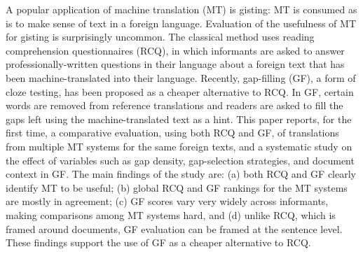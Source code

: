 A popular application of machine translation (MT) is gisting: MT is consumed as is to make sense of text in  a foreign language. Evaluation of the usefulness of MT for gisting is surprisingly uncommon. The classical method uses reading comprehension questionnaires (RCQ), in which informants are asked to answer professionally-written questions in their language about a foreign text that has been machine-translated into their language. Recently, gap-filling (GF), a form of cloze testing, has been proposed as a cheaper alternative to RCQ. In GF,  certain words are removed from reference translations and readers are asked to fill the gaps left using the machine-translated text as a hint. This paper reports, for the first time, a comparative evaluation, using both RCQ and GF, of translations from multiple MT systems for the same foreign texts, and a systematic study on the effect of variables such as gap density, gap-selection strategies, and document context in GF. The main findings of the study are: (a) both RCQ and GF clearly identify MT to be useful; (b) global RCQ and GF rankings for the MT systems are mostly in agreement; (c) GF scores vary very widely across informants, making comparisons among MT systems hard, and (d) unlike RCQ, which is framed around documents, GF evaluation can be framed at the sentence level. These findings support the use of GF as a cheaper alternative to RCQ.
